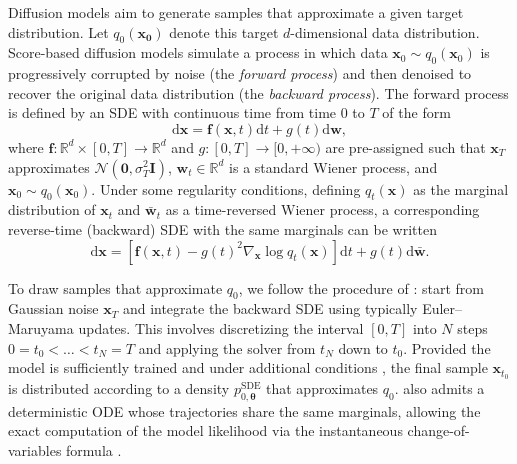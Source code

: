 \documentclass[10pt]{article} %
\def\rvw{{\mathbf{w}}}
\def\rvx{{\mathbf{x}}}
\def\vzero{{\bm{0}}}
\def\vtheta{{\bm{\theta}}}
\def\mI{{\bm{I}}}
\newcommand{\R}{\mathbb{R}}
\begin{document}
Diffusion models aim to generate samples that approximate a given target distribution. Let $q_0(\mathbf{x_0})$ denote this target $d$-dimensional data distribution. Score-based diffusion models \citep{song2020generativemodelingestimatinggradients,song2021maximum} simulate a process in which data $\rvx_0 \sim q_0(\rvx_0)$ is progressively corrupted by noise (the \textit{forward process}) and then denoised to recover the original data distribution (the \textit{backward process}). The forward process is defined by an SDE with continuous time from time $0$ to $T$ of the form
\begin{equation}\label{eq: forward diffusion process}
 \mathrm{d}\rvx  = \mathbf{f}(\rvx, t)\mathrm{d}t + g(t)\mathrm{d}\rvw,
\end{equation}
where $\mathbf{f}: \R^d \times [0,T] \rightarrow \R^d$ and $g: [0,T] \rightarrow [0, +\infty)$ are pre-assigned such that $\rvx_T$ approximates $\mathcal{N}(\vzero,\sigma_T^2 \mI)$, $\rvw_t \in \mathbb{R}^d$ is a standard Wiener process, and $\rvx_0 \sim q_0(\rvx_0)$. Under some regularity conditions, defining $q_t(\rvx)$ as the marginal distribution of $\rvx_t$ and $\bar{\rvw}_t$ as a time-reversed Wiener process, a corresponding reverse-time (backward) SDE with the same marginals can be written \citep{ANDERSON1982313, haussmann1986time}
\begin{equation}\label{eq: backward diffusion process}
\mathrm{d}\rvx = [\mathbf{f}(\rvx,t) - g(t)^2 \nabla_\rvx \log q_{t}(\rvx)]\mathrm{d}t + g(t)\mathrm{d}\bar{\rvw}.
\end{equation}

To draw samples that approximate $q_0$, we follow the procedure of \citet{song2021maximum}: start from Gaussian noise $\rvx_T$ and integrate the backward SDE using typically Euler–Maruyama updates. This involves discretizing the interval $[0,T]$ into $N$ steps $0 = t_0 < \dots < t_N = T$ and applying the solver from $t_N$ down to $t_0$. Provided the model is sufficiently trained and under additional conditions \citep{de2022convergence}, the final sample $\rvx_{t_0}$ is distributed according to a density $p_{0,\vtheta}^{\mathrm{SDE}}$ that approximates $q_0$. 
 also admits a deterministic ODE whose trajectories share the same marginals, allowing the exact computation of the model likelihood via the instantaneous change-of-variables formula \citep{chen2018neural}.
\end{document}
